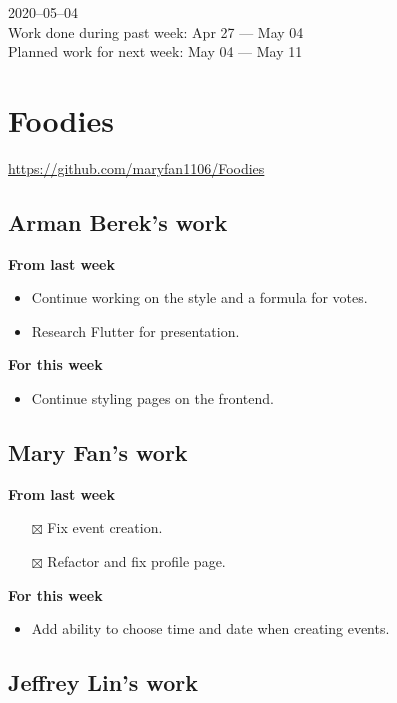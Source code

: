 \documentclass[12pt,letterpaper]{article}
\newcommand{\done}{$\boxtimes$}
\begin{document}
2020--05--04 \\
Work done during past week: Apr 27 --- May 04 \\
Planned work for next week: May 04 --- May 11

\section*{Foodies}
\url{https://github.com/maryfan1106/Foodies}

\subsection*{Arman Berek's work}

\textbf{From last week}
\begin{itemize}
  \item Continue working on the style and a formula for votes.
  \item Research Flutter for presentation.
\end{itemize}


\textbf{For this week}
\begin{itemize}
  \item Continue styling pages on the frontend.
\end{itemize}


\subsection*{Mary Fan's work}

\textbf{From last week}
\begin{itemize}
  \item[\done] Fix event creation.
  \item[\done] Refactor and fix profile page.
\end{itemize}


\textbf{For this week}
\begin{itemize}
  \item Add ability to choose time and date when creating events.
\end{itemize}


\subsection*{Jeffrey Lin's work}
\end{document}
